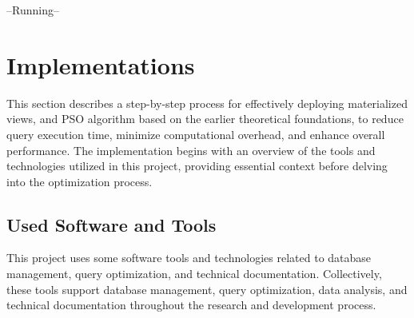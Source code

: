 \begin{center}
    --Running--
\end{center}
\section{Implementations}
This section describes a step-by-step process for effectively deploying materialized views, and PSO algorithm based on the earlier theoretical foundations, to reduce query execution time, minimize computational overhead, and enhance overall performance. The implementation begins with an overview of the tools and technologies utilized in this project, providing essential context before delving into the optimization process.

\subsection{Used Software and Tools}
This project uses some software tools and technologies related to database management, query optimization, and technical documentation. Collectively, these tools support database management, query optimization, data analysis, and technical documentation throughout the research and development process.

